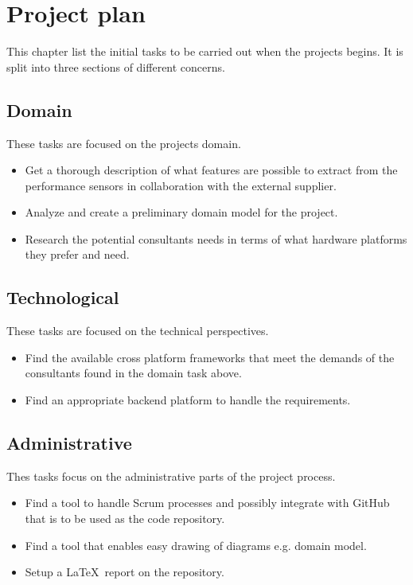\chapter{Project plan}
This chapter list the initial tasks to be carried out when the projects begins. It is split into three sections of different concerns.

\section*{Domain}
These tasks are focused on the projects domain.

\begin{itemize}
	\item Get a thorough description of what features are possible to extract from the performance sensors in collaboration with the external supplier.
	\item Analyze and create a preliminary domain model for the project.
	\item Research the potential consultants needs in terms of what hardware platforms they prefer and need.
\end{itemize}

\section*{Technological}
These tasks are focused on the technical perspectives.

\begin{itemize}
	\item Find the available cross platform frameworks that meet the demands of the consultants found in the domain task above.
	\item Find an appropriate backend platform to handle the requirements.
\end{itemize}

\section*{Administrative}
Thes tasks focus on the administrative parts of the project process.

\begin{itemize}
	\item Find a tool to handle Scrum processes and possibly integrate with GitHub that is to be used as the code repository.
	\item Find a tool that enables easy drawing of diagrams e.g. domain model.
	\item Setup a \LaTeX\ report on the repository.
\end{itemize}
